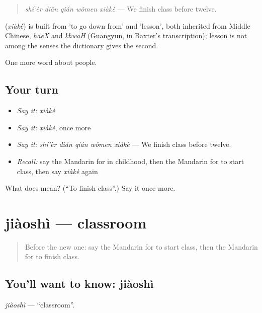 \begin{quote}
\textbf{} \emph{shí'èr diǎn qián wǒmen xiàkè} — We finish class before twelve.
\end{quote}

\begin{cousinweb}
\textbf{} (\emph{xiàkè}) is built from  'to go down from' and  'lesson', both inherited from Middle Chinese, \emph{haeX} and \emph{khwaH} (Guangyun, in Baxter's transcription); lesson is not among the senses the dictionary gives the second.
\end{cousinweb}

\begin{grammarlens}[title={What you've built}]
One more word about people.
\end{grammarlens}

\subsection*{Your turn}
\begin{itemize}
\raggedright
  \item \emph{Say it:} \emph{xiàkè}
  \item \emph{Say it:} \emph{xiàkè}, once more
  \item \emph{Say it:} \emph{shí'èr diǎn qián wǒmen xiàkè} — We finish class before twelve.
  \item \emph{Recall:} say the Mandarin for in childhood, then the Mandarin for to start class, then say \emph{xiàkè} again
\end{itemize}

\begin{tcolorbox}[breakable,colback=teal!4,colframe=teal!35!black,title={Before you move on}]
What does  mean? (\textquotedblleft{}To finish class\textquotedblright{}.) Say it once more.
\end{tcolorbox}
\section[jiàoshì]{jiàoshì — classroom}

\label{lesson:ZH-C79-jiaoshi}



\begin{quote}
Before the new one: say the Mandarin for to start class, then the Mandarin for to finish class.
\end{quote}

\subsection*{You'll want to know: jiàoshì}
\emph{jiàoshì} — \textquotedblleft{}classroom\textquotedblright{}.

